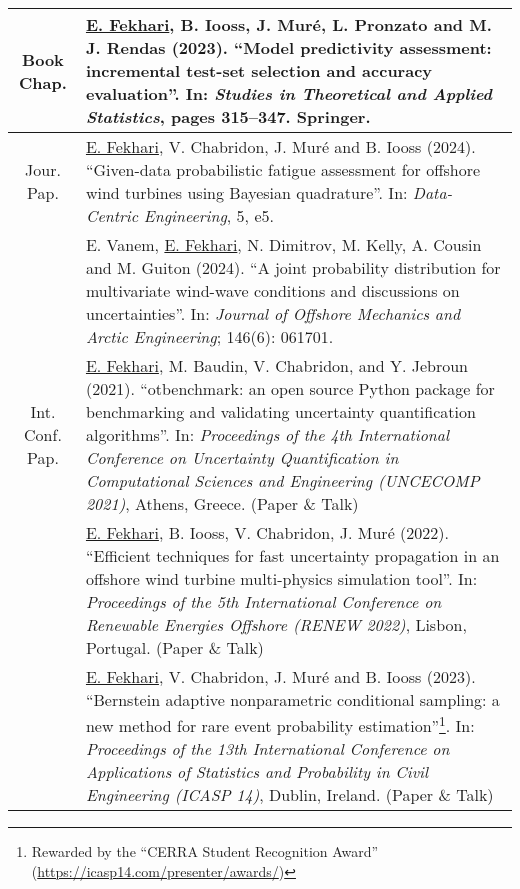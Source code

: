 
\begin{center}
    \footnotesize
    \renewcommand*{\arraystretch}{1.4}
    \begin{tabularx}{\textwidth}{c X}
        Book Chap.      & \underline{E. Fekhari}, B. Iooss, J. Mur\'{e}, L. Pronzato and M. J. Rendas (2023). 
                        ``Model predictivity assessment: incremental test-set selection and accuracy evaluation''. 
                        In: \textit{Studies in Theoretical and Applied Statistics}, pages 315--347. Springer.\\
        \hline  
        Jour. Pap.      & \underline{E. Fekhari}, V. Chabridon, J. Mur\'{e} and B. Iooss (2024).
                        ``Given-data probabilistic fatigue assessment for offshore wind turbines using Bayesian quadrature''. 
                        In: \textit{Data-Centric Engineering}, 5, e5.\\

                        & E. Vanem, \underline{E. Fekhari}, N. Dimitrov, M. Kelly, A. Cousin and M. Guiton (2024).
                        ``A joint probability distribution for multivariate wind-wave conditions and discussions on uncertainties''.
                        In: \textit{Journal of Offshore Mechanics and Arctic Engineering}; 146(6): 061701.\\
        \hline
\shortstack{Int. Conf.\\Pap.} & \underline{E. Fekhari}, M. Baudin, V. Chabridon, and Y. Jebroun (2021). 
                                ``otbenchmark: an open source Python package for benchmarking and validating uncertainty quantification algorithms''. 
                                In: \textit{Proceedings of the 4th International Conference on Uncertainty Quantification in Computational Sciences and Engineering (UNCECOMP 2021)}, Athens, Greece. (Paper \& Talk)\\
                    & \underline{E. Fekhari}, B. Iooss, V. Chabridon, J. Mur\'{e} (2022). 
                    ``Efficient techniques for fast uncertainty propagation in an offshore wind turbine multi-physics simulation tool''.
                    In: \textit{Proceedings of the 5th International Conference on Renewable Energies Offshore (RENEW 2022)}, Lisbon, Portugal. (Paper \& Talk)\\
        
                    & \underline{E. Fekhari}, V. Chabridon, J. Mur\'{e} and B. Iooss (2023). 
                    ``Bernstein adaptive nonparametric conditional sampling: a new method for rare event probability estimation''\footnote{Rewarded by the ``CERRA Student Recognition Award'' (\url{https://icasp14.com/presenter/awards/})}.
                    In: \textit{Proceedings of the 13th International Conference on Applications of Statistics and Probability in Civil Engineering (ICASP 14)}, Dublin, Ireland. (Paper \& Talk)\\
        

\end{tabularx}
\end{center}
